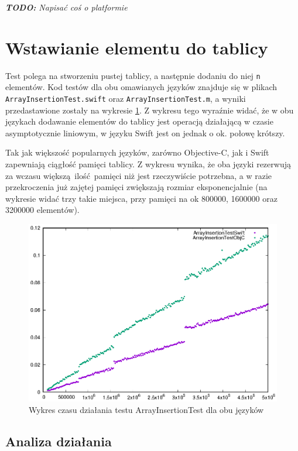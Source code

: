\documentclass[mgr, shortabstract]{iithesis}
\newcommand{\todo}[1]{
  \textit{\textbf{TODO: }#1}
}
\newcommand{\swiftinline}[1]{
    \texttt{#1}
}
\begin{document}
\todo{Napisać coś o platformie}

\section{Wstawianie elementu do tablicy}

Test polega na stworzeniu pustej tablicy, a następnie dodaniu do niej \swiftinline{n} elementów. Kod testów dla obu omawianych języków znajduje się w plikach \texttt{ArrayInsertionTest.swift} oraz \texttt{ArrayInsertionTest.m}, a wyniki przedastawione zostały na wykresie \ref{p:array_insertion}. Z wykresu tego wyraźnie widać, że w obu językach dodawanie elementów do tablicy jest operacją działającą w czasie asymptotycznie liniowym, w języku Swift jest on jednak o ok. połowę krótszy.

Tak jak większość popularnych języków, zarówno Objective-C, jak i Swift zapewniają ciągłość pamięci tablicy. Z wykresu wynika, że oba języki rezerwują za wczasu większą ilość pamięci niż jest rzeczywiście potrzebna, a w razie przekroczenia już zajętej pamięci zwiększają rozmiar eksponencjalnie (na wykresie widać trzy takie miejsca, przy pamięci na ok 800000, 1600000 oraz 3200000 elementów).

\begin{figure}
    \includegraphics{plots/ArrayInsertion.eps}
    \caption{Wykres czasu działania testu ArrayInsertionTest dla obu języków}
    \label{p:array_insertion}
\end{figure}

\subsection{Analiza działania}
\end{document}
